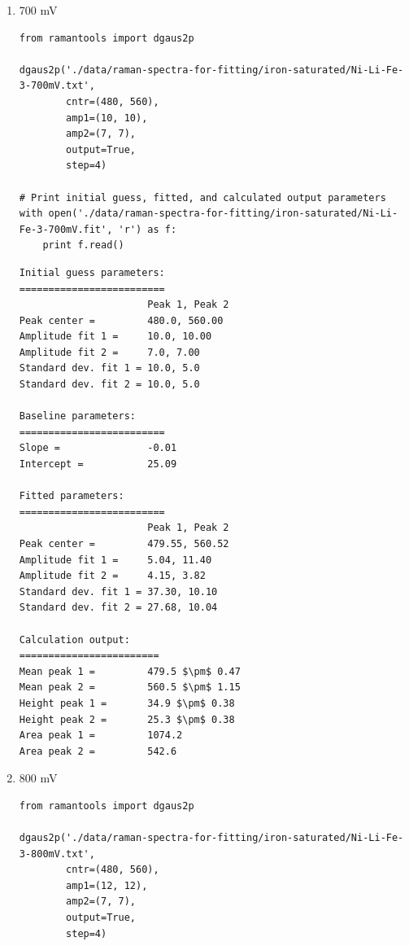 \documentclass[journal=jpccck,manuscript=suppinfo,email=true]{achemso}
\begin{document}
\begin{enumerate}
\begin{enumerate}
\begin{enumerate}
\begin{verbatim}
Calculation output:
========================
Mean peak 1 =         478.8 $\pm$ 0.35
Mean peak 2 =         560.2 $\pm$ 0.68
Height peak 1 =       46.4 $\pm$ 0.41
Height peak 2 =       34.9 $\pm$ 0.46
Area peak 1 =         1498.7
Area peak 2 =         784.8
\end{verbatim}

\item 700 mV
\label{sec-4-2-0-1-3-2}
\begin{verbatim}
from ramantools import dgaus2p

dgaus2p('./data/raman-spectra-for-fitting/iron-saturated/Ni-Li-Fe-3-700mV.txt',
        cntr=(480, 560),
        amp1=(10, 10),
        amp2=(7, 7),
        output=True,
        step=4)

# Print initial guess, fitted, and calculated output parameters
with open('./data/raman-spectra-for-fitting/iron-saturated/Ni-Li-Fe-3-700mV.fit', 'r') as f:
    print f.read()
\end{verbatim}

\begin{verbatim}
Initial guess parameters:
=========================
                      Peak 1, Peak 2
Peak center =         480.0, 560.00
Amplitude fit 1 =     10.0, 10.00
Amplitude fit 2 =     7.0, 7.00
Standard dev. fit 1 = 10.0, 5.0
Standard dev. fit 2 = 10.0, 5.0

Baseline parameters:
=========================
Slope =               -0.01
Intercept =           25.09

Fitted parameters:
=========================
                      Peak 1, Peak 2
Peak center =         479.55, 560.52
Amplitude fit 1 =     5.04, 11.40
Amplitude fit 2 =     4.15, 3.82
Standard dev. fit 1 = 37.30, 10.10
Standard dev. fit 2 = 27.68, 10.04

Calculation output:
========================
Mean peak 1 =         479.5 $\pm$ 0.47
Mean peak 2 =         560.5 $\pm$ 1.15
Height peak 1 =       34.9 $\pm$ 0.38
Height peak 2 =       25.3 $\pm$ 0.38
Area peak 1 =         1074.2
Area peak 2 =         542.6
\end{verbatim}

\item 800 mV
\label{sec-4-2-0-1-3-3}
\begin{verbatim}
from ramantools import dgaus2p

dgaus2p('./data/raman-spectra-for-fitting/iron-saturated/Ni-Li-Fe-3-800mV.txt',
        cntr=(480, 560),
        amp1=(12, 12),
        amp2=(7, 7),
        output=True,
        step=4)


\end{verbatim}
\end{enumerate}
\end{enumerate}
\end{enumerate}
\end{document}
